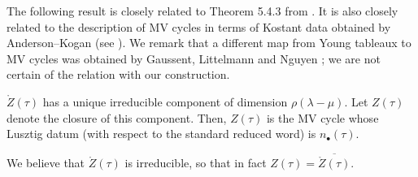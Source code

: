 \documentclass{article}
\begin{document}
The following result is closely related to  Theorem 5.4.3 from \cite{dthesis}. It is also closely related to the description of MV cycles in terms of Kostant data obtained by Anderson--Kogan \cite{anderson2004mirkovic} (see \cite[Section 9]{kamnitzer2010mirkovic}).  
We remark that a different map from Young tableaux to MV cycles was obtained by Gaussent, Littelmann and Nguyen \cite[Theorem 2]{gaussent2013knuth}; we are not certain of the relation with our construction. 

\begin{proposition}
    \label{pr:newmvdes}
    $ \mathring Z(\tau)$ has a unique irreducible component of dimension $ \rho(\lambda - \mu)$.  Let $ Z(\tau)$ denote the closure of this component.  Then, 
    $Z(\tau)$ is the MV cycle whose Lusztig datum (with respect to the standard reduced word) is $n_\bullet(\tau)$. 
\end{proposition}
% 
\begin{remark} \label{rem:irreducible}
We believe that $ \mathring Z(\tau)$ is irreducible, so that in fact $ Z(\tau) = \overline{ \mathring Z(\tau)}$.
\end{remark}
\end{document}
